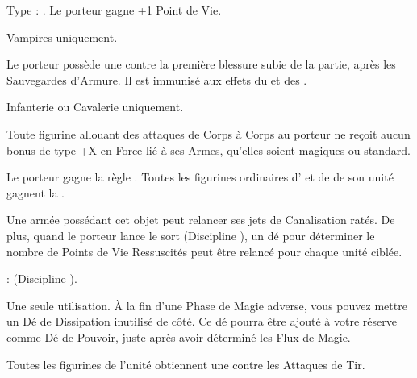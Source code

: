  Type : \platearmour{}. Le porteur gagne +1 Point de Vie.

\endpricelist

\armytalismans

\startpricelist

 Vampires uniquement.

Le porteur possède une  contre la première blessure subie de la partie, après les Sauvegardes d'Armure. Il est immunisé aux effets du  et des \multiplewounds{}{}.

 Infanterie ou Cavalerie uniquement.

Toute figurine allouant des attaques de Corps à Corps au porteur ne reçoit aucun bonus de type +X en Force lié à ses Armes, qu'elles soient magiques ou standard.

\endpricelist

\armyenchanteditems

\startpricelist

 Le porteur gagne la règle \distracting{}. Toutes les figurines ordinaires d'\infantry{} et de \cavalry{} de son unité gagnent la \parry{}.

\endpricelist

\armyarcaneitems

\startpricelist

 Une armée possédant cet objet peut relancer ses jets de Canalisation ratés. De plus, quand le porteur lance le sort \necromancysignaturespell{} (Discipline \necromancy{}), un dé pour déterminer le nombre de Points de Vie Ressuscités peut être relancé pour chaque unité ciblée.

  : \necromancyspelltwo{} (Discipline \necromancy{}).

 Une seule utilisation. À la fin d'une Phase de Magie adverse, vous pouvez mettre un Dé de Dissipation inutilisé de côté. Ce dé pourra être ajouté à votre réserve comme Dé de Pouvoir, juste après avoir déterminé les Flux de Magie.

\endpricelist

\armymagicalbanners

\startpricelist

 Toutes les figurines de l'unité obtiennent une  contre les Attaques de Tir. 

